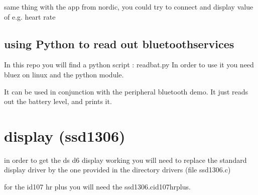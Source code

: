 \documentclass[letterpaper,10pt,english]{sphinxmanual}
\begin{document}
same thing with the app from nordic, you could try to connect and display value of e.g. heart rate


\section{using Python to read out bluetoothservices}
\label{\detokenize{bluetooth:using-python-to-read-out-bluetoothservices}}
In this repo you will find a python script : readbat.py
In order to use it you need bluez on linux and the python  module.

It can be used in conjunction with the peripheral bluetooth demo.
It just reads out the battery level, and prints it.

\begin{sphinxVerbatim}[commandchars=\\\{\}]
 
    

  

   

     \PYG{p}{[}\PYG{p}{]}
    
\end{sphinxVerbatim}


\chapter{display (ssd1306)}
\label{\detokenize{display:display-ssd1306}}\label{\detokenize{display:display-sample}}\label{\detokenize{display::doc}}
in order to get the ds d6 display working
you will need to replace the standard display driver by the one provided in the directory drivers
(file ssd1306.c)

for the id107 hr plus you will need the ssd1306.c\sphinxhyphen{}id107hrplus.
\end{document}
